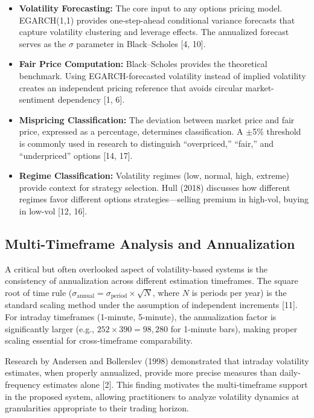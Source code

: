 \documentclass[12pt,a4paper]{article}
\begin{document}
\begin{itemize}
    \item \textbf{Volatility Forecasting:} The core input to any options pricing model. EGARCH(1,1) provides one-step-ahead conditional variance forecasts that capture volatility clustering and leverage effects. The annualized forecast serves as the $\sigma$ parameter in Black--Scholes [4, 10].

    \item \textbf{Fair Price Computation:} Black--Scholes provides the theoretical benchmark. Using EGARCH-forecasted volatility instead of implied volatility creates an independent pricing reference that avoids circular market-sentiment dependency [1, 6].

    \item \textbf{Mispricing Classification:} The deviation between market price and fair price, expressed as a percentage, determines classification. A $\pm$5\% threshold is commonly used in research to distinguish ``overpriced,'' ``fair,'' and ``underpriced'' options [14, 17].

    \item \textbf{Regime Classification:} Volatility regimes (low, normal, high, extreme) provide context for strategy selection. Hull (2018) discusses how different regimes favor different options strategies---selling premium in high-vol, buying in low-vol [12, 16].
\end{itemize}

\subsection{Multi-Timeframe Analysis and Annualization}

A critical but often overlooked aspect of volatility-based systems is the consistency of annualization across different estimation timeframes. The square root of time rule ($\sigma_\text{annual} = \sigma_\text{period} \times \sqrt{N}$, where $N$ is periods per year) is the standard scaling method under the assumption of independent increments [11]. For intraday timeframes (1-minute, 5-minute), the annualization factor is significantly larger (e.g., $252 \times 390 = 98{,}280$ for 1-minute bars), making proper scaling essential for cross-timeframe comparability.

Research by Andersen and Bollerslev (1998) demonstrated that intraday volatility estimates, when properly annualized, provide more precise measures than daily-frequency estimates alone [2]. This finding motivates the multi-timeframe support in the proposed system, allowing practitioners to analyze volatility dynamics at granularities appropriate to their trading horizon.
\end{document}
